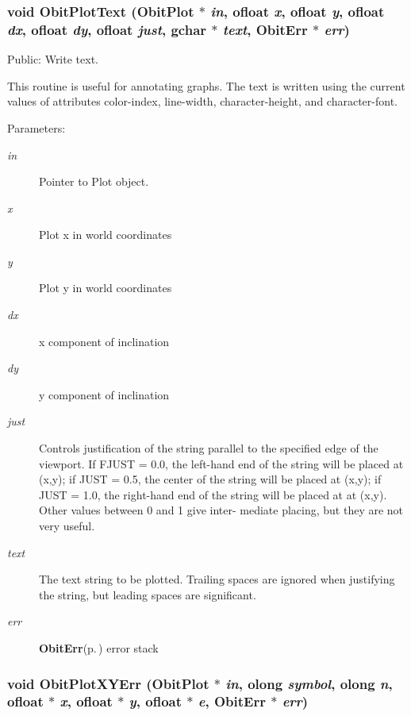\subsubsection{\setlength{\rightskip}{0pt plus 5cm}void Obit\-Plot\-Text ({\bf Obit\-Plot} $\ast$ {\em in}, {\bf ofloat} {\em x}, {\bf ofloat} {\em y}, {\bf ofloat} {\em dx}, {\bf ofloat} {\em dy}, {\bf ofloat} {\em just}, gchar $\ast$ {\em text}, {\bf Obit\-Err} $\ast$ {\em err})}\label{ObitPlot_8h_a23}


Public: Write text. 

This routine is useful for annotating graphs. The text is written using the current values of attributes color-index, line-width, character-height, and character-font. \begin{Desc}
\item[Parameters:]
\begin{description}
\item[{\em in}]Pointer to Plot object. \item[{\em x}]Plot x in world coordinates \item[{\em y}]Plot y in world coordinates \item[{\em dx}]x component of inclination \item[{\em dy}]y component of inclination \item[{\em just}]Controls justification of the string parallel to the specified edge of the viewport. If FJUST = 0.0, the left-hand end of the string will be placed at (x,y); if JUST = 0.5, the center of the string will be placed at (x,y); if JUST = 1.0, the right-hand end of the string will be placed at at (x,y). Other values between 0 and 1 give inter- mediate placing, but they are not very useful. \item[{\em text}]The text string to be plotted. Trailing spaces are ignored when justifying the string, but leading spaces are significant. \item[{\em err}]{\bf Obit\-Err}{\rm (p.\,\pageref{structObitErr})} error stack \end{description}
\end{Desc}
\subsubsection{\setlength{\rightskip}{0pt plus 5cm}void Obit\-Plot\-XYErr ({\bf Obit\-Plot} $\ast$ {\em in}, {\bf olong} {\em symbol}, {\bf olong} {\em n}, {\bf ofloat} $\ast$ {\em x}, {\bf ofloat} $\ast$ {\em y}, {\bf ofloat} $\ast$ {\em e}, {\bf Obit\-Err} $\ast$ {\em err})}\label{ObitPlot_8h_a11}


